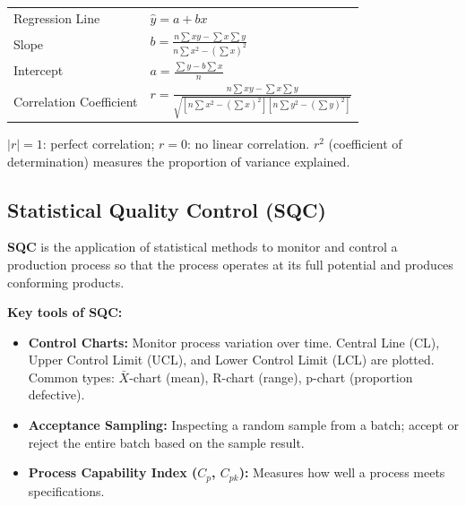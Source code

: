 \documentclass[12pt,a4paper]{article}
\renewcommand{\arraystretch}{1.45}
\begin{document}
\begin{tcolorbox}[formulabox, title={\textbf{Simple Linear Regression (Trend Line)}}]
\renewcommand{\arraystretch}{1.3}
\begin{tabularx}{\linewidth}{B{4.0cm} X}Regression Line & $\hat{y} = a + bx$ \\[4pt]
Slope & $\displaystyle b = \frac{n\sum xy - \sum x \sum y}{n \sum x^2 - \left(\sum x\right)^2}$ \\[8pt]
Intercept & $\displaystyle a = \frac{\sum y - b\sum x}{n}$ \\[6pt]
Correlation Coefficient & $\displaystyle r = \frac{n\sum xy - \sum x \sum y}{\sqrt{[n\sum x^2 - (\sum x)^2][n\sum y^2 - (\sum y)^2]}}$
\end{tabularx}
\par\vspace{4pt}
$|r| = 1$: perfect correlation; $r = 0$: no linear correlation. $r^2$ (coefficient of determination) measures the proportion of variance explained.
\end{tcolorbox}

\subsection{Statistical Quality Control (SQC)}

\begin{tcolorbox}[defbox, title={\textbf{Statistical Quality Control (SQC)}}]
\textbf{SQC} is the application of statistical methods to monitor and control a production process so that the process operates at its full potential and produces conforming products.
\end{tcolorbox}

\textbf{Key tools of SQC:}
\begin{itemize}[leftmargin=*, itemsep=3pt]
  \item \textbf{Control Charts:} Monitor process variation over time. Central Line (CL), Upper Control Limit (UCL), and Lower Control Limit (LCL) are plotted. Common types: $\bar{X}$-chart (mean), R-chart (range), p-chart (proportion defective).
  \item \textbf{Acceptance Sampling:} Inspecting a random sample from a batch; accept or reject the entire batch based on the sample result.
  \item \textbf{Process Capability Index ($C_p$, $C_{pk}$):} Measures how well a process meets specifications.
\end{itemize}
\end{document}
